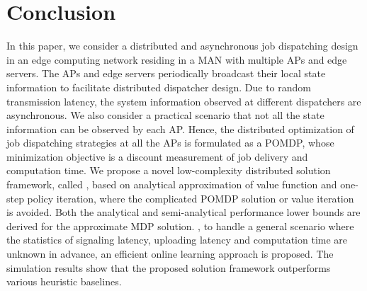 \section{Conclusion}
\label{sec:conclusion}
In this paper, we consider a distributed and asynchronous job dispatching design in an edge computing network residing in a MAN with multiple APs and edge servers.
The APs and edge servers periodically broadcast their local state information to facilitate distributed dispatcher design.
Due to random transmission latency, the system information observed at different dispatchers are asynchronous.
We also consider a practical scenario that not all the state information can be observed by each AP.
Hence, the distributed optimization of job dispatching strategies at all the APs is formulated as a POMDP, whose minimization objective is a discount measurement of job delivery and computation time.
We propose a novel low-complexity distributed solution framework, called \algname, based on analytical approximation of value function and one-step policy iteration, where the complicated POMDP solution or value iteration is avoided. Both the analytical and semi-analytical performance lower bounds are derived for the approximate MDP solution.
, to handle a general scenario where the statistics of signaling latency, uploading latency and computation time are unknown in advance, an efficient online learning approach is proposed.
The simulation results show that the proposed solution framework outperforms various heuristic baselines.
